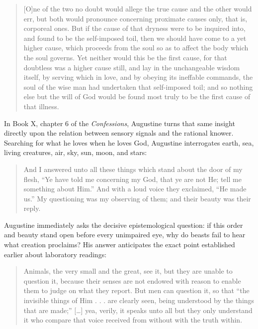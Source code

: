 \begin{quote}
[O]ne of the two no doubt would allege the true cause and the other would err, but both would pronounce concerning proximate causes only, that is, corporeal ones. But if the cause of that dryness were to be inquired into, and found to be the self-imposed toil, then we should have come to a yet higher cause, which proceeds from the soul so as to affect the body which the soul governs. Yet neither would this be the first cause, for that doubtless was a higher cause still, and lay in the unchangeable wisdom itself, by serving which in love, and by obeying its ineffable commands, the soul of the wise man had undertaken that self-imposed toil; and so nothing else but the will of God would be found most truly to be the first cause of that illness.
\end{quote}

In Book X, chapter 6 of the \emph{Confessions}, Augustine turns that same insight directly upon the relation between sensory signals and the rational knower. Searching for what he loves when he loves God, Augustine interrogates earth, sea, living creatures, air, sky, sun, moon, and stars:

\begin{quote}
And I answered unto all these things which stand about the door of my flesh, ``Ye have told me concerning my God, that ye are not He; tell me something about Him.'' And with a loud voice they exclaimed, ``He made us.'' My questioning was my observing of them; and their beauty was their reply.
\end{quote}

Augustine immediately asks the decisive epistemological question: if this order and beauty stand open before every unimpaired eye, why do beasts fail to hear what creation proclaims? His answer anticipates the exact point established earlier about laboratory readings:

\begin{quote}
Animals, the very small and the great, see it, but they are unable to question it, because their senses are not endowed with reason to enable them to judge on what they report. But men can question it, so that ``the invisible things of Him . . . are clearly seen, being understood by the things that are made;'' [\ldots] yea, verily, it speaks unto all but they only understand it who compare that voice received from without with the truth within.
\end{quote}

